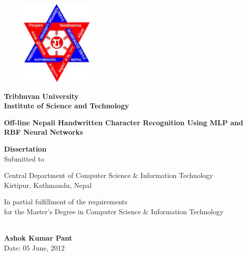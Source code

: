 \pagestyle{empty}
\begin{figure}[tp] %
\centering
\includegraphics[width=100pt]{title_pages/logo.eps}
\end{figure}


\begin{center}
    \Large\textbf{{Tribhuvan University\\
    Institute of Science and Technology}}   					%

 {\Huge \vspace*{20mm} \textbf{{Off-line Nepali Handwritten Character Recognition Using MLP and RBF Neural Networks}}}\par		%

{ \vspace*{20mm} \textbf{{\Large Dissertation}\\}}
									\large Submitted to\par	%
{\large\vspace*{10mm} Central Department of Computer Science \& Information Technology\\
					Kirtipur, Kathmandu, Nepal }\par
					
	
{\large\vspace*{20mm} In partial fulfillment of the requirements\\
					for the Master’s Degree in Computer Science \& Information Technology }\par %

{\vspace*{20mm}{By}}\\								
{\textbf{Ashok Kumar Pant}}							%
\\Date: 05 June, 2012
\end{center}
